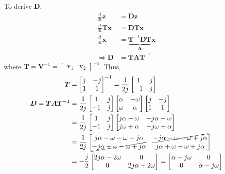 \documentclass[]{article}
\newcommand{\diff}[1]{\frac{d}{d #1}}
\begin{document}
To derive \(\bm{D}\),
\begin{align}
	\diff{t} \bm{z} &= \bm{Dz} \\
	\diff{t} \bm{Tx} &= \bm{DTx} \\
	\diff{t} \bm{x} &= \underbrace{\bm{T}^{-1}\bm{DT}}_{\bm{A}} \bm{x} \\
	\Rightarrow \bm{D} &= \bm{TA}\bm{T}^{-1}
\end{align}
where \(\bm{T} = \bm{V}^{-1} = \begin{bmatrix}
\bm{v}_1 & \bm{v}_2
\end{bmatrix}^{-1}\).
Thus,
\begin{align}
	\bm{T} &=
	\begin{bmatrix}
	j & -j \\
	1 & 1
	\end{bmatrix}^{-1} =
	\frac{1}{2j} \begin{bmatrix}
	1 & j \\
	-1 & j
	\end{bmatrix} \\
	\bm{D} = \bm{TA}\bm{T}^{-1} &= \frac{1}{2j} \begin{bmatrix}
	1 & j \\
	-1 & j
	\end{bmatrix}
	\begin{bmatrix}
	\alpha & -\omega \\
	\omega & \alpha
	\end{bmatrix}
	\begin{bmatrix}
	j & -j \\
	1 & 1
	\end{bmatrix} \\
	&= \frac{1}{2j} \begin{bmatrix}
	1 & j \\
	-1 & j
	\end{bmatrix}
	\begin{bmatrix}
	j\alpha - \omega & -j\alpha - \omega \\
	j\omega + \alpha & -j\omega + \alpha
	\end{bmatrix} \\
	&= \frac{1}{2j} \begin{bmatrix}
	j\alpha - \omega - \omega + j\alpha & \cancel{-j\alpha - \omega + \omega + j\alpha} \\
	\cancel{-j\alpha + \omega - \omega + j\alpha} & j\alpha + \omega + \omega + j\alpha
	\end{bmatrix} \\
	&= -\frac{j}{2} \begin{bmatrix}
	2j\alpha - 2\omega & 0 \\
	0 & 2j\alpha + 2\omega
	\end{bmatrix} = \begin{bmatrix}
	\alpha + j\omega & 0 \\
	0 & \alpha - j\omega
	\end{bmatrix}
\end{align}
\end{document}
